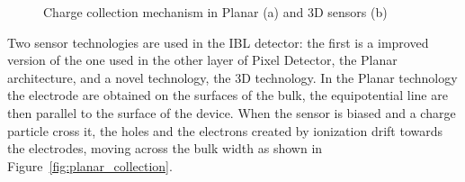 \begin{figure}
\caption{Charge collection mechanism in Planar (a) and 3D sensors (b)}
\end{figure}
Two sensor technologies are used in the IBL detector: the first is a improved version of the one used in the other layer of Pixel Detector, the Planar\cite{Planar} architecture, and a novel technology, the 3D\cite{3d} technology.
In the Planar technology the electrode are obtained on the surfaces of the bulk, the equipotential line are then parallel to the surface of the device. When the sensor is biased and a charge particle cross it, the holes and the electrons created by ionization drift towards the electrodes, moving across the bulk width as shown in Figure~\ref{fig:planar_collection}.\\
